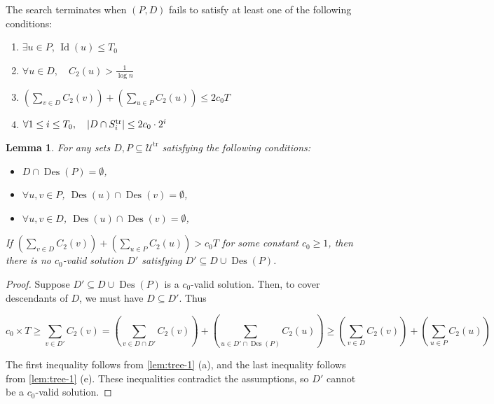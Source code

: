 \documentclass[11pt,a4paper]{article} \usepackage{enumitem}
\newcommand{\calU}{\mathcal{U}}
\newcommand{\trU}{\operatorname{\calU^{tr}}}
\newcommand{\trS}[1]{\ifx\relax#1\relax
    S^{\operatorname{tr}} \else
    S^{\operatorname{tr}}_{#1} \fi
}
\newcommand{\Des}{\operatorname{Des}}
\newcommand{\Lev}{\operatorname{Id}}
\newtheorem{lemma}[theorem]{Lemma}
\theoremstyle{definition}
\begin{document}
The search terminates when \( (P, D) \) fails to satisfy at least one of the following conditions:
\begin{enumerate}
\item $\exists u\in P$, $\Lev(u)\le T_0$
\item \( \forall u\in D, \quad C_2(u) > \frac{1}{\log n} \)
\item \( \left(\sum_{v \in D} C_2(v)\right) + \left(\sum_{u \in P} C_2(u)\right) \le 2c_0 T \)
\item \( \forall 1\le i \leq T_0, \quad |D \cap \trS{i}| \le 2c_0 \cdot 2^i \)
\end{enumerate}


\begin{lemma}\label{lem:tree-6}
For any sets $D, P \subseteq \trU$ satisfying the following conditions:

\begin{itemize}
\item $D \cap \Des(P) = \emptyset$,

\item $\forall u, v \in P$, $\Des(u) \cap \Des(v) = \emptyset$,

\item $\forall u, v \in D$, $\Des(u) \cap \Des(v) = \emptyset$,

\end{itemize}
If $\left(\sum_{v \in D} C_2(v)\right) + \left(\sum_{u \in P} C_2(u)\right) > c_0 T$ for some constant $c_0 \geq 1$, then there is no $c_0$-valid solution $D'$ satisfying $D' \subseteq D \cup \Des(P)$.
\end{lemma}

\begin{proof}
Suppose $D' \subseteq D \cup \Des(P)$ is a $c_0$-valid solution. Then, to cover descendants of $D$, we must have $D\subseteq D'$. Thus

$$c_0\times T\ge \sum_{v\in D'} C_2(v)=\left(\sum_{v\in D\cap D'} C_2(v)\right)+\left(\sum_{u\in D'\cap \Des(P)}C_2(u)\right)\ge \left(\sum_{v\in D} C_2(v)\right)+\left(\sum_{u\in P}C_2(u)\right)$$

The first inequality follows from \cref{lem:tree-1} (a), and the last inequality follows from \cref{lem:tree-1} (e). These inequalities contradict the assumptions,  so $D'$ cannot be a $c_0$-valid solution.

\end{proof}
\end{document}
